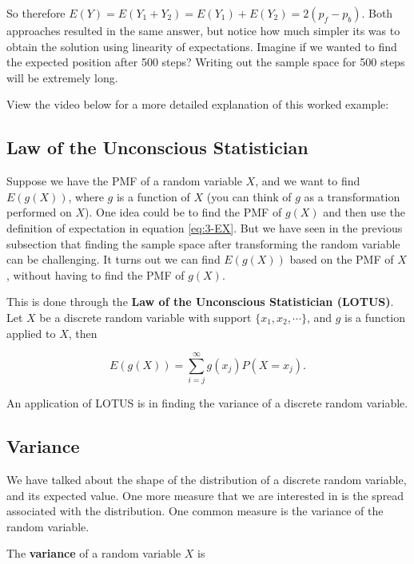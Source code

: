 \documentclass[
]{book}
\begin{document}
So therefore \(E(Y) = E(Y_1 + Y_2) = E(Y_1) + E(Y_2) = 2(p_f - p_b)\). Both approaches resulted in the same answer, but notice how much simpler its was to obtain the solution using linearity of expectations. Imagine if we wanted to find the expected position after 500 steps? Writing out the sample space for 500 steps will be extremely long.

View the video below for a more detailed explanation of this worked example:

\hypertarget{law-of-the-unconscious-statistician}{%
\subsection{Law of the Unconscious Statistician}\label{law-of-the-unconscious-statistician}}

Suppose we have the PMF of a random variable \(X\), and we want to find \(E(g(X))\), where \(g\) is a function of \(X\) (you can think of \(g\) as a transformation performed on \(X\)). One idea could be to find the PMF of \(g(X)\) and then use the definition of expectation in equation \eqref{eq:3-EX}. But we have seen in the previous subsection that finding the sample space after transforming the random variable can be challenging. It turns out we can find \(E(g(X))\) based on the PMF of \(X\), without having to find the PMF of \(g(X)\).

This is done through the \textbf{Law of the Unconscious Statistician (LOTUS)}. Let \(X\) be a discrete random variable with support \(\{x_1, x_2, \cdots \}\), and \(g\) is a function applied to \(X\), then

\begin{equation} 
E(g(X)) = \sum_{i=j}^{\infty} g(x_j) P(X=x_j).
\label{eq:3-lotus}
\end{equation}

An application of LOTUS is in finding the variance of a discrete random variable.

\hypertarget{variance}{%
\subsection{Variance}\label{variance}}

We have talked about the shape of the distribution of a discrete random variable, and its expected value. One more measure that we are interested in is the spread associated with the distribution. One common measure is the variance of the random variable.

The \textbf{variance} of a random variable \(X\) is
\end{document}
